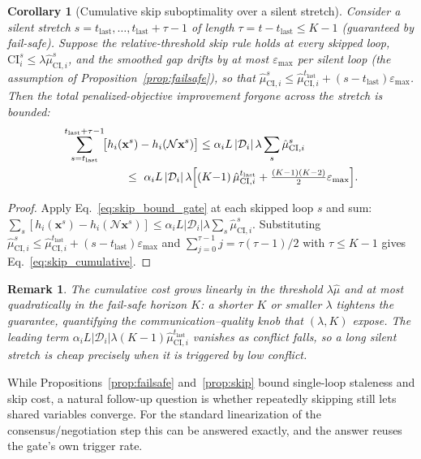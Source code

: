 \documentclass[conference]{IEEEtran}
\newtheorem{corollary}{Corollary}
\newtheorem{remark}{Remark}
\begin{document}
\begin{corollary}[Cumulative skip suboptimality over a silent stretch]\label{cor:skip_cumulative}
Consider a silent stretch $s=t_{\mathrm{last}},\dots,t_{\mathrm{last}}+\tau-1$ of length $\tau=t-t_{\mathrm{last}}\le K-1$ (guaranteed by fail-safe). Suppose the relative-threshold skip rule holds at every skipped loop, $\mathrm{CI}_i^s\le\lambda\hat{\mu}_{\mathrm{CI},i}^s$, and the smoothed gap drifts by at most $\varepsilon_{\max}$ per silent loop (the assumption of Proposition~\ref{prop:failsafe}), so that $\hat{\mu}_{\mathrm{CI},i}^s\le\hat{\mu}_{\mathrm{CI},i}^{t_{\mathrm{last}}}+(s-t_{\mathrm{last}})\varepsilon_{\max}$. Then the total penalized-objective improvement forgone across the stretch is bounded:
\begin{align}
\sum_{s=t_{\mathrm{last}}}^{t_{\mathrm{last}}+\tau-1}\!\!\big[h_i(\mathbf{x}^s)-h_i(\mathcal{N}\mathbf{x}^s)\big]
&\le \alpha_i L\,|\mathcal{D}_i|\,\lambda\sum_{s}\hat{\mu}_{\mathrm{CI},i}^s \nonumber\\
&\hspace{-6.5em}\le\ \alpha_i L\,|\mathcal{D}_i|\,\lambda\Big[(K{-}1)\,\hat{\mu}_{\mathrm{CI},i}^{t_{\mathrm{last}}}+\tfrac{(K{-}1)(K{-}2)}{2}\varepsilon_{\max}\Big].
\label{eq:skip_cumulative}
\end{align}
\end{corollary}
\begin{proof}
Apply Eq.~\eqref{eq:skip_bound_gate} at each skipped loop $s$ and sum: $\sum_s[h_i(\mathbf{x}^s)-h_i(\mathcal{N}\mathbf{x}^s)]\le\alpha_i L|\mathcal{D}_i|\lambda\sum_s\hat{\mu}_{\mathrm{CI},i}^s$. Substituting $\hat{\mu}_{\mathrm{CI},i}^s\le\hat{\mu}_{\mathrm{CI},i}^{t_{\mathrm{last}}}+(s-t_{\mathrm{last}})\varepsilon_{\max}$ and $\sum_{j=0}^{\tau-1}j=\tau(\tau-1)/2$ with $\tau\le K-1$ gives Eq.~\eqref{eq:skip_cumulative}.
\end{proof}
\begin{remark}
The cumulative cost grows linearly in the threshold $\lambda\hat{\mu}$ and at most quadratically in the fail-safe horizon $K$: a shorter $K$ or smaller $\lambda$ tightens the guarantee, quantifying the communication--quality knob that $(\lambda,K)$ expose. The leading term $\alpha_i L|\mathcal{D}_i|\lambda(K{-}1)\hat{\mu}_{\mathrm{CI},i}^{t_{\mathrm{last}}}$ vanishes as conflict falls, so a long silent stretch is cheap precisely when it is triggered by low conflict.
\end{remark}

While Propositions~\ref{prop:failsafe} and~\ref{prop:skip} bound single-loop staleness and skip cost, a natural follow-up question is whether repeatedly skipping still lets shared variables converge. For the standard linearization of the consensus/negotiation step this can be answered exactly, and the answer reuses the gate's own trigger rate.
\end{document}
